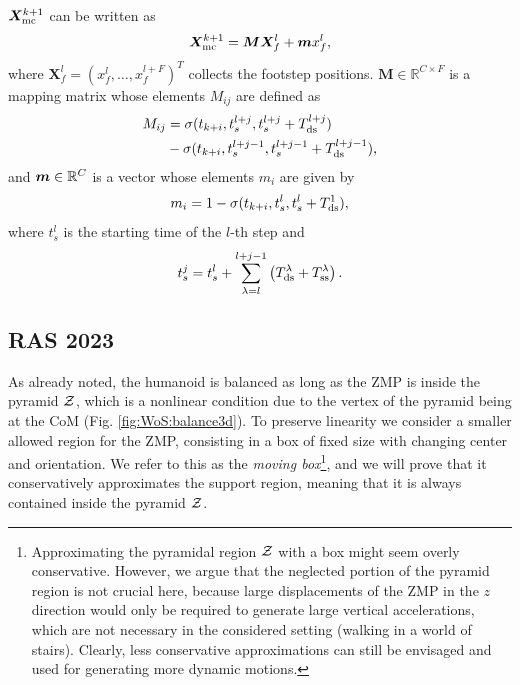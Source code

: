 $\bm{X}_{\rm mc}^{k+1}$ can be written as
\begin{equation}
\label{eq:FAPA:mapping}
\bm{X}_{\rm mc}^{k+1} = \bm{M} \bm{X}_f^l + \bm{m}x_f^l,
\end{equation}
where $\bm{X}_{f}^{l} = (x_{f}^{l}, \dots, x_{f}^{l+F})^T$ collects the footstep positions. $\bm{M}\in\mathbb{R}^{C\times F}$ is a mapping matrix whose elements $M_{ij}$ are defined as
\begin{equation}\begin{split}
M_{ij} &= \sigma(t_{k+i}, t_s^{l+j},t_s^{l+j}+T_{\rm ds}^{l+j})\\ &- \sigma(t_{k+i}, t_s^{l+j-1},t_s^{l+j-1}+T_{\rm ds}^{l+j-1}),
\end{split}\end{equation}
and ${\bm{m}}\in\mathbb{R}^{C}$ is a vector whose elements $m_i$ are given by
\begin{equation*}
m_{i} = 1 - \sigma(t_{k+i}, t_s^{l},t_s^{l}+T_{\rm ds}^{1}),
\end{equation*}
where $t_s^l$ is the starting time of the $l$-th step and
\begin{equation*}
    t^j_s = t^l_s + \sum^{l+j-1}_{\lambda=l} \left(T_{\rm ds}^\lambda + T_{\rm ss}^\lambda\right).
\end{equation*}

\subsection{RAS 2023}
As already noted, the humanoid is balanced as long as the ZMP is inside the pyramid $\cal Z$, which is a nonlinear condition due to the vertex of the pyramid being at the CoM (Fig. \ref{fig:WoS:balance3d}). To preserve linearity we consider a smaller allowed region for the ZMP, consisting in a box of fixed size with changing center and orientation. We refer to this as the {\em moving box}\footnote{Approximating the pyramidal region $\cal Z$ with a box might seem overly conservative. However, we argue that the neglected portion of the pyramid region is not crucial here, because large displacements of the ZMP in the $z$ direction would only be required to generate large vertical accelerations, which are not necessary in the considered setting (walking in a world of stairs). Clearly, less conservative approximations can still be envisaged and used for generating more dynamic motions.}, and we will prove that it conservatively approximates the support region, meaning that it is always contained inside the pyramid $\cal Z$.



